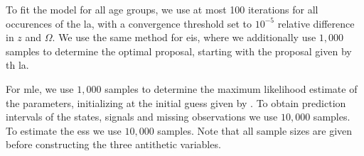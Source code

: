 
To fit the model for all age groups, we use at most 100 iterations for all occurences of the \acrshort{la}, with a convergence threshold set to $10^{-5}$ relative difference in $z$ and $\Omega$. We use the same method for \acrshort{eis}, where we additionally use $1,000$ samples to determine the optimal proposal, starting with the proposal given by th \acrshort{la}.

For \acrshort{mle}, we use $1,000$ samples to determine the maximum likelihood estimate of the parameters, initializing at the initial guess given by .
To obtain prediction intervals of the states, signals and missing observations we use $10,000$ samples. To estimate the \acrshort{ess} we use $10,000$ samples. Note that all sample sizes are given before constructing the three antithetic variables.
